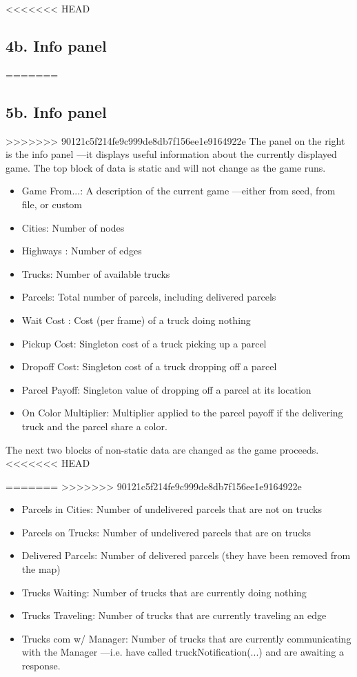 \documentclass[11pt]{article}
\begin{document}
\begin{itemize}
<<<<<<< HEAD
\subsection{4b. Info panel}
=======
\subsection{5b. Info panel}
>>>>>>> 90121c5f214fe9c999de8db7f156ee1e9164922e
The panel on the right is the info panel ---it displays useful information about the currently displayed game.
The top block of data is static and will not change as the game runs.
\begin{itemize}
\item Game From...: A description of the current game ---either from seed, from file, or custom
\item Cities: Number of nodes
\item Highways : Number of edges
\item Trucks:  Number of available trucks
\item Parcels:  Total number of parcels, including delivered parcels
\item Wait Cost : Cost (per frame) of a truck doing nothing
\item Pickup Cost: Singleton cost of a truck picking up a parcel
\item Dropoff Cost: Singleton cost of a truck dropping off a parcel
\item Parcel Payoff: Singleton value of dropping off a parcel at its location
\item On Color Multiplier: Multiplier applied to the parcel payoff if the delivering truck and the parcel share a color.
\end{itemize}

The next two blocks of non-static data are changed as the game proceeds.
<<<<<<< HEAD

=======
>>>>>>> 90121c5f214fe9c999de8db7f156ee1e9164922e
\begin{itemize}
\item Parcels in Cities: Number of undelivered parcels that are not on trucks
\item Parcels on Trucks: Number of undelivered parcels that are on trucks
\item Delivered Parcels: Number of delivered parcels (they have been removed from the map)
\item Trucks Waiting: Number of trucks that are currently doing nothing
\item Trucks Traveling: Number of trucks that are currently traveling an edge
\item Trucks com w/ Manager: Number of trucks that are currently communicating with the Manager —i.e. have called truckNotification(...) and are awaiting a response.
\end{itemize}


\end{itemize}
\end{document}
